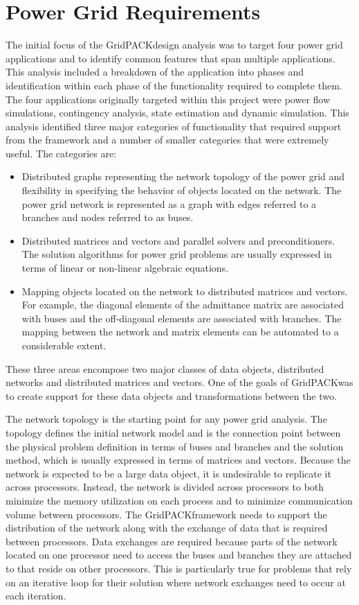 \documentclass[preprint]{acm_proc_article-sp}
\begin{document}
\section{Power Grid Requirements}
The initial focus of the GridPACK\texttrademark design analysis was to target
four power grid
applications and to identify common features that span multiple applications.
This analysis included a breakdown of the
application into phases and identification within each phase of the functionality
required to complete them. The four applications originally targeted within this
project were power flow simulations\cite{PF}, contingency analysis\cite{CA},
state estimation\cite{SE} and
dynamic simulation\cite{DS}. This analysis identified three major categories of
functionality that
required support from the framework and a number of smaller categories that were
extremely useful. The categories are:
\begin{itemize}
\item Distributed graphs representing the network topology of the power grid
and flexibility in specifying the behavior of objects located on the network.
The power grid network is represented as a graph with edges referred to a
branches and nodes referred to as buses. 
\item Distributed matrices and vectors and parallel solvers and
preconditioners. The solution algorithms for power grid problems are usually
expressed in terms of linear or non-linear algebraic equations. 
\item Mapping objects located on the network to distributed matrices and vectors.
For example, the diagonal elements of the admittance matrix are associated with
buses and the off-diagonal elements are associated with branches. The mapping
between the network and matrix elements can be automated to a considerable
extent.
\end{itemize}
These three areas encompose two major classes of data objects,
distributed networks and distributed matrices and vectors. One of the goals of
GridPACK\texttrademark was to create support for these data objects and transformations
between the two.

The network topology is the starting point for any power grid analysis. The
topology defines the initial network model and is the connection point between
the physical problem definition in terms of buses and branches and the solution
method, which is usually expressed in terms of matrices and vectors. Because the
network is expected to be a large data object, it is undesirable to replicate
it across processors. Instead, the network is divided across processors
to both minimize the memory utilization on each process and to minimize
communication volume between processors. The GridPACK\texttrademark framework needs to
support the distribution of the network along with the exchange of data that is
required between processors. Data exchanges are required because parts of the
network located on one processor need to access the buses and branches they are
attached to that reside on other processors. This is particularly true for
problems that rely on an iterative loop for their solution where network
exchanges need to occur at each iteration.
\end{document}
